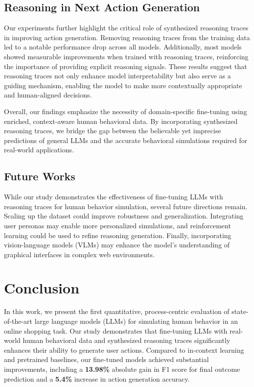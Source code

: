 \documentclass[11pt]{article}
\begin{document}
\subsection{Reasoning in Next Action Generation}

Our experiments further highlight the critical role of synthesized reasoning traces in improving action generation. Removing reasoning traces from the training data led to a notable performance drop across all models. Additionally, most models showed measurable improvements when trained with reasoning traces, reinforcing the importance of providing explicit reasoning signals.
These results suggest that reasoning traces not only enhance model interpretability but also serve as a guiding mechanism, enabling the model to make more contextually appropriate and human-aligned decisions. 

Overall, our findings emphasize the necessity of domain-specific fine-tuning using enriched, context-aware human behavioral data.
By incorporating synthesized reasoning traces, we bridge the gap between the believable yet imprecise predictions of general LLMs and the accurate behavioral simulations required for real-world applications.  

\subsection{Future Works}

While our study demonstrates the effectiveness of fine-tuning LLMs with reasoning traces for human behavior simulation, several future directions remain.
Scaling up the dataset could improve robustness and generalization.
Integrating user personas may enable more personalized simulations, and reinforcement learning could be used to refine reasoning generation.
Finally, incorporating vision-language models (VLMs) may enhance the model’s understanding of graphical interfaces in complex web environments.

\section{Conclusion}

In this work, we present the first quantitative, process-centric evaluation of state-of-the-art large language models (LLMs) for simulating human behavior in an online shopping task.
Our study demonstrates that fine-tuning LLMs with real-world human behavioral data and synthesized reasoning traces significantly enhances their ability to generate user actions.
Compared to in-context learning and pretrained baselines, our fine-tuned models achieved substantial improvements, including a \textbf{13.98\%} absolute gain in F1 score for final outcome prediction and a \textbf{5.4\%} increase in action generation accuracy.
\end{document}
